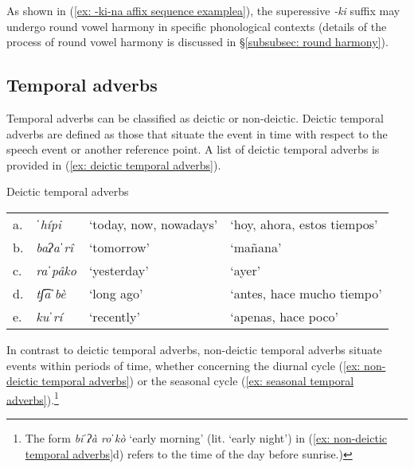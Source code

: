 As shown in (\ref{ex: -ki-na affix sequence examplea}), the superessive \textit{-ki} suffix may undergo round vowel harmony in specific phonological contexts (details of the process of round vowel harmony is discussed in §\ref{subsubsec: round harmony}).

\subsection{Temporal adverbs}
\label{subsec: temporal adverbs}

Temporal adverbs can be classified as deictic or non-deictic. Deictic temporal adverbs are defined as those that situate the event in time with respect to the speech event or another reference point. A list of deictic temporal adverbs is provided in (\ref{ex: deictic temporal adverbs}).

\ea\label{ex: deictic temporal adverbs}
{Deictic temporal adverbs}

\begin{tabular}{llll}
    a. & {\textit{ˈhípi}}&{`today, now, nowadays'}& {`hoy, ahora, estos tiempos'}\\
    b. & {\textit{baʔaˈrî}}&{`tomorrow'}& {`mañana'}\\
    c. & {\textit{raˈpâko}}&{`yesterday'}& {`ayer'}\\
    d. &{\textit{tʃ͡aˈbè}}&{`long ago'}& {`antes, hace mucho tiempo'}\\
    e. & {\textit{kuˈrí}}&{`recently'}& {`apenas, hace poco'}\\
\end{tabular}
    \z

In contrast to deictic temporal adverbs, non-deictic temporal adverbs situate events within periods of time, whether concerning the diurnal cycle (\ref{ex: non-deictic temporal adverbs}) or the seasonal cycle (\ref{ex: seasonal temporal adverbs}).\footnote{The form \textit{biˈʔà roˈkò} `early morning' (lit. `early night') in (\ref{ex: non-deictic temporal adverbs}d) refers to the time of the day before sunrise.)}

